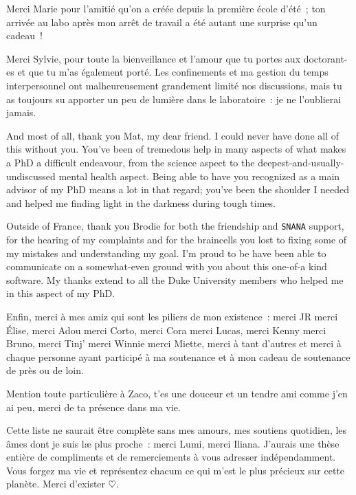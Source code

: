 \documentclass[../main/main.tex]{subfiles}
\begin{document}
Merci Marie pour l'amitié qu'on a créée depuis la première école d'été~; ton
arrivée au labo après mon arrêt de travail a été autant une surprise qu'un
cadeau~!

Merci Sylvie, pour toute la bienveillance et l'amour que tu portes aux
doctorant-es et que tu m'as également porté. Les confinements et ma gestion du
temps interpersonnel ont malheureusement grandement limité nos discussions, mais
tu as toujours su apporter un peu de lumière dans le laboratoire~: je ne
l'oublierai jamais.

And most of all, thank you Mat, my dear friend. I could never have done all of
this without you. You've been of tremedous help in many aspects of what makes a
PhD a difficult endeavour, from the science aspect to the
deepest-and-usually-undiscussed mental health aspect. Being able to have you
recognized as a main advisor of my PhD means a lot in that regard\string; you've been
the shoulder I needed and helped me finding light in the darkness during tough
times. %

Outside of France, thank you Brodie for both the friendship and \texttt{SNANA}
support, for the hearing of my complaints and for the braincells you lost to
fixing some of my mistakes and understanding my goal. I'm proud to be have been
able to communicate on a somewhat-even ground with you about this one-of-a kind
software. My thanks extend to all the Duke University members who helped me in
this aspect of my PhD.

Enfin, merci à mes amiz qui sont les piliers de mon existence~: merci JR merci
Élise, merci Adou merci Corto, merci Cora merci Lucas, merci Kenny merci Bruno,
merci Tinj' merci Winnie merci Miette, merci à tant d'autres et merci à chaque
personne ayant participé à ma soutenance et à mon cadeau de soutenance de près
ou de loin.

Mention toute particulière à Zaco, t'es une douceur et un tendre ami comme j'en
ai peu, merci de ta présence dans ma vie.

\vfill

Cette liste ne saurait être complète sans mes amours, mes soutiens quotidien,
les âmes dont je suis læ plus proche~: merci Lumi, merci Iliana. J'aurais une
thèse entière de compliments et de remerciements à vous adresser indépendamment.
Vous forgez ma vie et représentez chacum ce qui m'est le plus précieux sur cette
planète. Merci d'exister $\heartsuit$.

\vfill
\end{document}

